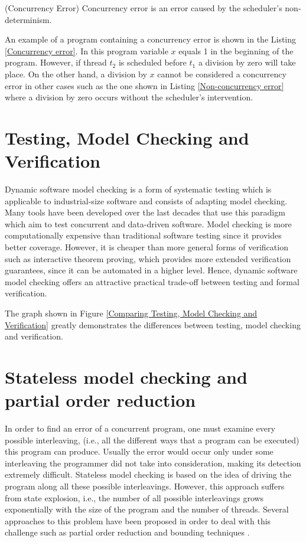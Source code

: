\begin{definition}{(Concurrency Error)}
    Concurrency error is an error caused by the scheduler's non-determinism.
\end{definition}

An example of a program containing a concurrency error is shown in the Listing \ref{Concurrency error}. In this program variable $x$ equals 1 in the beginning of the program. However,
if thread $t_2$ is scheduled before $t_1$ a division by zero will take place. On the other hand, a division by $x$ cannot be considered a concurrency error in other cases
such as the one shown in Listing \ref{Non-concurrency error} where a division by zero occurs without the scheduler's intervention.


\section{Testing, Model Checking and Verification}

Dynamic software model checking is a form of systematic testing which is applicable to industrial-size software and consists of adapting model checking.
Many tools have been developed over the last decades that use this paradigm which aim to test concurrent and data-driven software. Model checking is more computationally
expensive than traditional software testing since it provides better coverage. However, it is cheaper than more general forms of verification such as interactive theorem
proving, which provides more extended verification guarantees, since it can be automated in a higher level.
Hence, dynamic software model checking offers an attractive practical trade-off between testing and formal verification. 

The graph shown in Figure \ref{Comparing Testing, Model Checking and Verification} \cite{TestingvsVerification} greatly demonstrates the differences between testing, model checking and verification.


\section{Stateless model checking and partial order reduction}

In order to find an error of a concurrent program, one must examine every possible interleaving, (i.e., all the different ways that a program can be executed) this program can produce. Usually the error 
would occur only under some interleaving the programmer did not take into consideration, making its detection extremely difficult. Stateless model checking is based on the idea of driving 
the program along all these possible interleavings. However, this approach suffers from state explosion, i.e., the number of all possible interleavings grows 
exponentially with the size of the program and the number of threads. Several approaches to this problem have been proposed in order to deal with this challenge such as
partial order reduction \cite{Godefroid1996} and bounding techniques \cite{BPOR}. 

